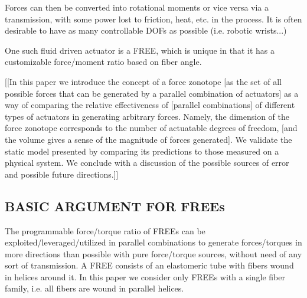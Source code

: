 Forces can then be converted into rotational moments or vice versa via a transmission, with some power lost to friction, heat, etc. in the process. It is often desirable to have as many controllable DOFs as possible (i.e. robotic wrists...)





One such fluid driven actuator is a FREE, which is unique in that it has a customizable force/moment ratio based on fiber angle.

[[In this paper we introduce the concept of a force zonotope [as the set of all possible forces that can be generated by a parallel combination of actuators] as a way of comparing the relative effectiveness of [parallel combinations] of different types of actuators in generating arbitrary forces. Namely, the dimension of the force zonotope corresponds to the number of actuatable degrees of freedom, [and the volume gives a sense of the magnitude of forces generated]. We validate the static model presented by comparing its predictions to those measured on a physical system. We conclude with a discussion of the possible sources of error and possible future directions.]]

\subsection{BASIC ARGUMENT FOR FREEs}

The programmable force/torque ratio of FREEs can be exploited/leveraged/utilized in parallel combinations to generate forces/torques in more directions than possible with pure force/torque sources, without need of any sort of transmission. A FREE consists of an elastomeric tube with fibers wound in helices around it. In this paper we consider only FREEs with a single fiber family, i.e. all fibers are wound in parallel helices.















